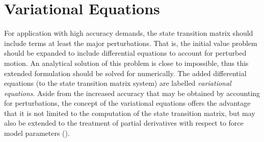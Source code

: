 \section{Variational Equations}\label{sec:pod-variational-equations}

For application with high accuracy demands, the state transition matrix should include 
terms at least the major perturbations. That is, the initial value problem should be 
expanded to include differential equations to account for perturbed motion. An 
analytical solution of this problem is close to impossible, thus this extended  
formulation should be solved for numerically. The added differential equations (to 
the state transition matrix system) are labelled \emph{variational equations}. 
Aside from the increased accuracy that may be obtained by accounting for perturbations, the
concept of the variational equations offers the advantage that it is not limited to the
computation of the state transition matrix, but may also be extended to the treatment
of partial derivatives with respect to force model parameters (\cite{Montenbruck2000}).

